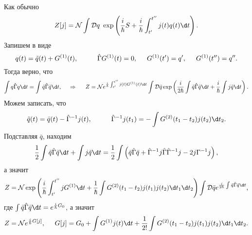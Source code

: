 Как обычно
\begin{equation*}
    Z[j] = \mathcal N \int \mathcal D q\ \exp\left(
        \frac{i}{\hbar}S + \frac{i}{\hbar} \int_{t'}^{t''} j(t) q(t) \d t
    \right).
\end{equation*}
Запишем в виде
\begin{equation*}
    q(t) = \tilde{q}(t) + G^{(1)} (t),
    \hspace{10 mm}
    \hat{\Gamma} G^{(1)} (t) = 0,
    \hspace{5 mm} 
    G^{(1)} (t') = q',
    \hspace{5 mm} 
    G^{(1)}(t'') = q''.
\end{equation*}
Тогда верно, что
\begin{equation*}
    \int q \hat{\Gamma} q \d t = \int \tilde{q} \hat{\Gamma} \tilde{q} \d t,
    \hspace{0.5cm} \Rightarrow \hspace{0.5cm}
    Z = \mathcal N e^{\frac{i}{\hbar}\int_{t'}^{t''} j(t) G^{(1)} (t) \d t} \int \mathcal D \tilde{q} \exp\left(
        \frac{i}{2\hbar} \int \tilde{q} \hat{\Gamma} \tilde{q} \d t + \frac{i}{\hbar} \int j \tilde{q} \d t
    \right).
\end{equation*}
Можем записать, что
\begin{equation*}
    \tilde{q}(t) = \bar{q}(t) - \hat{\Gamma}^{-1} j(t),
    \hspace{10 mm} 
    \hat{\Gamma}^{-1} j(t_1) = - \int G^{(2)} (t_1-t_2) j(t_2) \d t_2.
\end{equation*}
Подставляя $\bar{q}$, находим
\begin{equation*}
    \frac{1}{2} \int \tilde{q} \hat{\Gamma} \tilde{q} \d t + \int j \tilde{q} \d t = 
    \frac{1}{2} \int \left(
        \bar{q} \hat{\Gamma} \bar{q} + \hat{\Gamma}^{-1} j \hat{\Gamma} \hat{\Gamma}^{-1} j - 2 j \Gamma^{-1} j
    \right),
\end{equation*}
а значит
\begin{equation*}
    Z = \mathcal N \exp\left(
        \frac{i}{\hbar} \int_{t'}^{t''} j G^{(1)} \d t + \frac{1}{\hbar} 
        \int G^{(2)} (t_1 - t_2) j(t_1) j(t_2) \d t_1 \d t_2
    \right) 
    \int \mathcal D \bar{q} e^{\frac{i}{2\hbar} \int \bar{q} \hat{\Gamma} \bar{q} \d t},
\end{equation*}
где $\int \bar{q} \hat{\Gamma} \bar{q} \d t = e^{\frac{i}{\hbar} G_0}$, а значит
\begin{equation*}
    Z = \mathcal N e^{\frac{i}{\hbar} G[j]},
    \hspace{5 mm} 
    G[j] = G_0 + \int G^{(1)} j(t) \d t + \frac{1}{2!} \int G^{(2)} (t_1-t_2) j(t_1) j(t_2) \d t_1 \d t_2.
\end{equation*}

